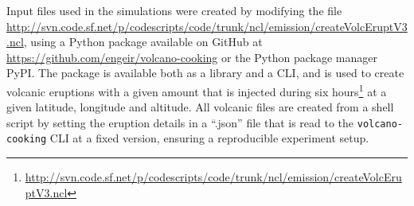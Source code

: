 \documentclass{ametsocV6.1}
\begin{document}
%






%



\appendix

\appendix[A]


Input files used in the simulations were created by modifying the file
\url{http://svn.code.sf.net/p/codescripts/code/trunk/ncl/emission/createVolcEruptV3.ncl},
using a Python package available on GitHub at
\url{https://github.com/engeir/volcano-cooking} or the Python package manager PyPI\@.
The package is available both as a library and a CLI, and is used to create volcanic
eruptions with a given  amount that is injected during six
hours\footnote{\url{http://svn.code.sf.net/p/codescripts/code/trunk/ncl/emission/createVolcEruptV3.ncl}}
at a given latitude, longitude and altitude. All volcanic  files are created
from a shell script by setting the eruption details in a ``.json'' file that is read to
the \texttt{volcano-cooking} CLI at a fixed version, ensuring a reproducible experiment
setup.
\end{document}
